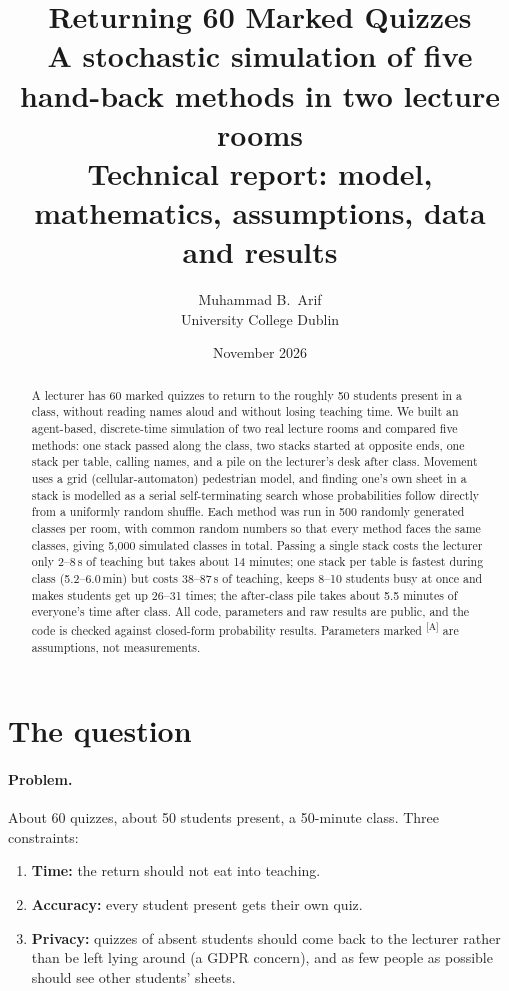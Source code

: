 \documentclass[11pt,a4paper]{article}
\title{\textbf{Returning 60 Marked Quizzes}\\[4pt]
\large A stochastic simulation of five hand-back methods in two lecture rooms\\[2pt]
\normalsize Technical report: model, mathematics, assumptions, data and results}
\author{Muhammad B.\ Arif\\ \small University College Dublin}
\date{November 2026}
\newcommand{\assume}{\textcolor{flag}{\textsuperscript{[A]}}}
\begin{document}
\maketitle

\begin{abstract}
\noindent
A lecturer has 60 marked quizzes to return to the roughly 50 students present in a class, without reading names aloud and without losing teaching time.
We built an agent-based, discrete-time simulation of two real lecture rooms and compared five methods: one stack passed along the class, two stacks started at opposite ends, one stack per table, calling names, and a pile on the lecturer's desk after class.
Movement uses a grid (cellular-automaton) pedestrian model, and finding one's own sheet in a stack is modelled as a serial self-terminating search whose probabilities follow directly from a uniformly random shuffle.
Each method was run in 500 randomly generated classes per room, with common random numbers so that every method faces the same classes, giving 5{,}000 simulated classes in total.
Passing a single stack costs the lecturer only 2--8\,s of teaching but takes about 14 minutes; one stack per table is fastest during class (5.2--6.0\,min) but costs 38--87\,s of teaching, keeps 8--10 students busy at once and makes students get up 26--31 times; the after-class pile takes about 5.5 minutes of everyone's time after class.
All code, parameters and raw results are public, and the code is checked against closed-form probability results.
Parameters marked \assume{} are assumptions, not measurements.
\end{abstract}

\tableofcontents
\newpage

\section{The question}

\paragraph{Problem.} About 60 quizzes, about 50 students present, a 50-minute class. Three constraints:
\begin{enumerate}
  \item \textbf{Time:} the return should not eat into teaching.
  \item \textbf{Accuracy:} every student present gets their own quiz.
  \item \textbf{Privacy:} quizzes of absent students should come back to the lecturer rather than be left lying around (a GDPR concern), and as few people as possible should see other students' sheets.
\end{enumerate}
\end{document}
